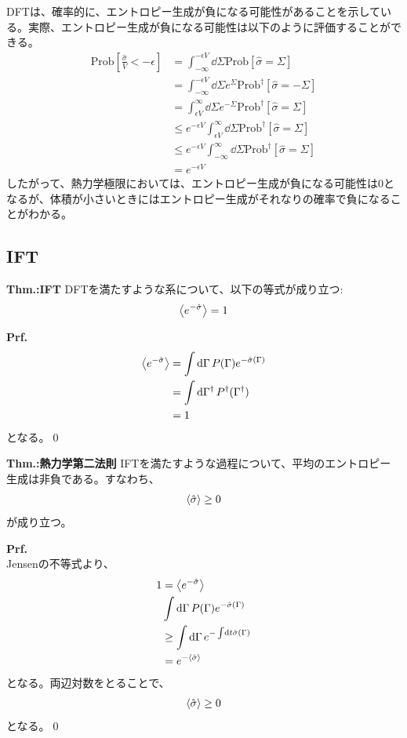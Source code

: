 \documentclass[a4paper,11pt]{jsarticle}
\numberwithin{equation}{section}
\begin{document}
DFTは、確率的に、エントロピー生成が負になる可能性があることを示している。実際、エントロピー生成が負になる可能性は以下のように評価することができる。\\
\begin{align}
  \text{Prob}\left[\frac{\hat{\sigma}}{V} < -\epsilon \right] &= \int_{-\infty}^{-\epsilon V} \dd{\Sigma}\text{Prob}[\hat{\sigma} = \Sigma]\\
  &= \int_{-\infty}^{-\epsilon V} \dd{\Sigma}e^{\Sigma}\text{Prob}^{\dagger}[\hat{\sigma} = -\Sigma]\\
  &= \int_{\epsilon V}^{\infty} \dd{\Sigma}e^{-\Sigma}\text{Prob}^{\dagger}[\hat{\sigma} = \Sigma]\\
  &\leq e^{-\epsilon V} \int_{\epsilon V}^{\infty} \dd{\Sigma}\text{Prob}^{\dagger}[\hat{\sigma} = \Sigma]\\
  &\leq e^{-\epsilon V} \int_{-\infty}^{\infty} \dd{\Sigma}\text{Prob}^{\dagger}[\hat{\sigma} = \Sigma]\\
  &= e^{-\epsilon V}
\end{align}
したがって、熱力学極限においては、エントロピー生成が負になる可能性は0となるが、体積が小さいときにはエントロピー生成がそれなりの確率で負になることがわかる。\\

\subsection{IFT}
\begin{itembox}[l]{\textbf{Thm.:IFT}}
  DFTを満たすような系について、以下の等式が成り立つ:
  \begin{align}
    \ev{e^{-\hat{\sigma}}} = 1
  \end{align}
\end{itembox}
\textbf{Prf.}\\
\begin{align}
  \ev{e^{-\hat{\sigma}}} &= \int \dd{\Gamma}P(\Gamma)e^{-\hat{\sigma}(\Gamma)}\\
  &= \int \dd{\Gamma^{\dagger}}P^{\dagger}(\Gamma^{\dagger})\\
  &= 1
\end{align}
となる。\qed

\begin{itembox}[l]{\textbf{Thm.:熱力学第二法則}}
  IFTを満たすような過程について、平均のエントロピー生成は非負である。すなわち、
  \begin{align}
    \ev{\hat{\sigma}} \geq 0
  \end{align}
  が成り立つ。
\end{itembox}
\textbf{Prf.}\\
Jensenの不等式より、
\begin{align}
  1 &= \ev{e^{-\hat{\sigma}}}\\
  &\int \dd{\Gamma}P(\Gamma)e^{-\hat{\sigma}(\Gamma)}\\
  &\geq \int \dd{\Gamma} e^{-\int \dd{t}\hat{\sigma}(\Gamma)}\\
  &= e^{-\ev{\hat{\sigma}}}
\end{align}
となる。両辺対数をとることで、
\begin{align}
  \ev{\hat{\sigma}} \geq 0
\end{align}
となる。\qed
\end{document}
